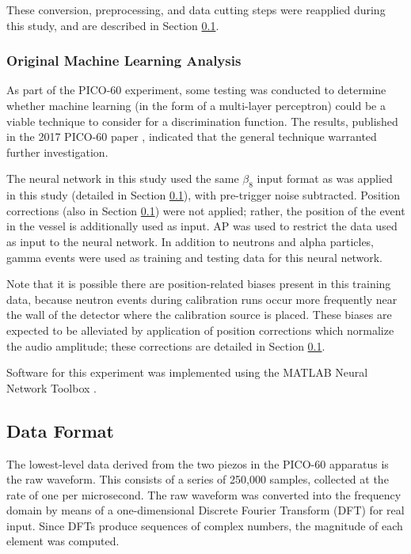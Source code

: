 \documentclass[10pt]{article}
\begin{document}
These conversion, preprocessing, and data cutting steps were reapplied during this study, and are described in Section \ref{data_format}.

\subsubsection{Original Machine Learning Analysis} \label{og_analysis}

As part of the PICO-60 experiment, some testing was conducted to determine whether machine learning (in the form of a multi-layer perceptron) could be a viable technique to consider for a discrimination function. The results, published in the 2017 PICO-60 paper \cite{pico}, indicated that the general technique warranted further investigation.

The neural network in this study used the same $\beta_{8}$ input format as was applied in this study (detailed in Section \ref{data_format}), with pre-trigger noise subtracted. Position corrections (also in Section \ref{data_format}) were not applied; rather, the position of the event in the vessel is additionally used as input. AP was used to restrict the data used as input to the neural network. In addition to neutrons and alpha particles, gamma events were used as training and testing data for this neural network.

Note that it is possible there are position-related biases present in this training data, because neutron events during calibration runs occur more frequently near the wall of the detector where the calibration source is placed. These biases are expected to be alleviated by application of position corrections which normalize the audio amplitude; these corrections are detailed in Section \ref{data_format}.

Software for this experiment was implemented using the MATLAB Neural Network Toolbox \cite{matlab}.

\subsection{Data Format} \label{data_format}

The lowest-level data derived from the two piezos in the PICO-60 apparatus is the raw waveform. This consists of a series of 250,000 samples, collected at the rate of one per microsecond. The raw waveform was converted into the frequency domain by means of a one-dimensional Discrete Fourier Transform (DFT) for real input. Since DFTs produce sequences of complex numbers, the magnitude of each element was computed.
\end{document}
